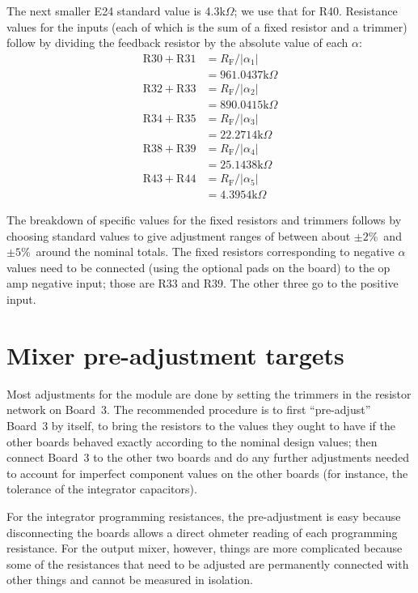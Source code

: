 The next smaller E24 standard value is 4.3k$\Omega$; we use that for R40.
Resistance values for the inputs (each of which is the sum of a fixed
resistor and a trimmer) follow by dividing the feedback resistor by the
absolute value of each $\alpha$:
\begin{align*}
  \textrm{R}30+\textrm{R}31 &= R_\textrm{F}/|\alpha_1| \\
    &= 961.0437\textrm{k}\Omega \\
  \textrm{R}32+\textrm{R}33 &= R_\textrm{F}/|\alpha_2| \\
    &= 890.0415\textrm{k}\Omega \\
  \textrm{R}34+\textrm{R}35 &= R_\textrm{F}/|\alpha_3| \\
    &= 22.2714\textrm{k}\Omega \\
  \textrm{R}38+\textrm{R}39 &= R_\textrm{F}/|\alpha_4| \\
    &= 25.1438\textrm{k}\Omega \\
  \textrm{R}43+\textrm{R}44 &= R_\textrm{F}/|\alpha_5| \\
    &= 4.3954\textrm{k}\Omega
\end{align*}

The breakdown of specific values for the fixed resistors and trimmers
follows by choosing standard values to give adjustment ranges of between
about $\pm2$\%\ and $\pm5$\%\ around the nominal totals.  The fixed
resistors corresponding to negative $\alpha$ values need to be connected
(using the optional pads on the board) to the op amp negative input; those
are R33 and R39.  The other three go to the positive input.

\section{Mixer pre-adjustment targets}

Most adjustments for the module are done by setting the trimmers in the
resistor network on Board~3.  The recommended procedure is to first
``pre-adjust'' Board~3 by itself, to bring the resistors to the values they
ought to have if the other boards behaved exactly according to the nominal
design values; then connect Board~3 to the other two boards and do any
further adjustments needed to account for imperfect component values on the
other boards (for instance, the tolerance of the integrator capacitors).

For the integrator programming resistances, the pre-adjustment is easy
because disconnecting the boards allows a direct ohmeter reading of each
programming resistance.  For the output mixer, however, things are more
complicated because some of the resistances that need to be adjusted are
permanently connected with other things and cannot be measured in isolation.


